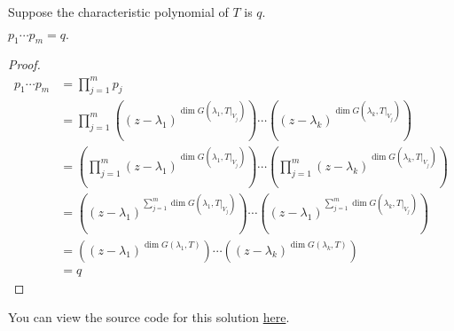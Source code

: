\documentclass{amsart}
\newcommand{\restrict}[2]{\left.#1\right|_{#2}}
\newcommand{\pagenum}{269}
\newcommand{\probnum}{20}
\begin{document}
Suppose the characteristic polynomial of $T$ is $q.$
\begin{claim*}
    $p_1\cdots p_m=q.$
\end{claim*}
\begin{proof}
\begin{align*}
    p_1\cdots p_m &= \prod_{j=1}^m{p_j} \\
                  &= \prod_{j=1}^m{
                      \left((z-\lambda_1)^{\dim G(\lambda_1,\restrict{T}{V_j})}\right)
                  \cdots
              \left((z-\lambda_k)^{\dim G(\lambda_k,\restrict{T}{V_j})}\right)
          }\\
          &= \left(\prod_{j=1}^m
                      (z-\lambda_1)^{\dim G(\lambda_1,\restrict{T}{V_j})}
                      \right)
                      \cdots
                      \left(\prod_{j=1}^m
                      (z-\lambda_k)^{\dim G(\lambda_k,\restrict{T}{V_j})}
                      \right)\\
          &= \left((z-\lambda_1)
          ^{\sum_{j=1}^m\dim G(\lambda_1,\restrict{T}{V_j})}\right)
          \cdots
          \left((z-\lambda_1)
          ^{\sum_{j=1}^m\dim G(\lambda_k,\restrict{T}{V_j})}\right)\\
          &= \left((z-\lambda_1)^{\dim{G(\lambda_1,T)}}\right)
          \cdots
          \left((z-\lambda_k)^{\dim{G(\lambda_k,T)}}\right)\\
          &= q
\end{align*}
\end{proof}

\vspace{0.5in}

\begin{note*}
You can view the source code for this solution
\href{https://github.com/thomasbreydo/linalg/blob/main/\pagenum_\probnum_Thomas_Breydo.tex}
{here}.
\end{note*}
\end{document}
